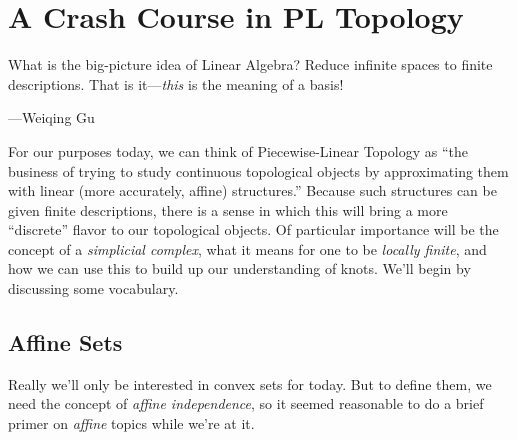 \chapter{A Crash Course in PL Topology}\label{appendix:pl-topology}
\epigraph{What is the big-picture idea of Linear Algebra? Reduce
  infinite spaces to finite descriptions. That is it---\emph{this} is
  the meaning of a basis!}{---Weiqing Gu}
\def\figdir{figures/appendix/}

For our purposes today, we can think of Piecewise-Linear Topology as
``the business of trying to study continuous topological objects by
approximating them with linear (more accurately, affine) structures.''
Because such structures can be given finite descriptions, there is a
sense in which this will bring a more ``discrete'' flavor to our
topological objects. Of particular importance will be the concept of a
\emph{simplicial complex}, what it means for one to be \emph{locally
  finite}, and how we can use this to build up our understanding of
knots. We'll begin by discussing some vocabulary. %

\section{Affine Sets}
Really we'll only be interested in convex sets for today. But to
define them, we need the concept of \emph{affine independence}, so it
seemed reasonable to do a brief primer on \emph{affine} topics while
we're at it.

